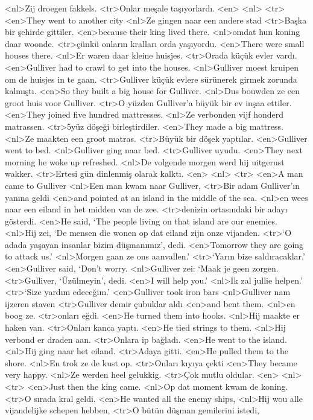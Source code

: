 <nl>Zij droegen fakkels.
<tr>Onlar meşale taşıyorlardı.
<en>
<nl>
<tr>
<en>They went to another city
<nl>Ze gingen naar een andere stad
<tr>Başka bir şehirde gittiler.
<en>because their king lived there.
<nl>omdat hun koning daar woonde.
<tr>çünkü onların kralları orda yaşıyordu.
<en>There were small houses there.
<nl>Er waren daar kleine huisjes.
<tr>Orada küçük evler vardı.
<en>Gulliver had to crawl to get into the houses.
<nl>Gulliver moest kruipen om de huisjes in te gaan.
<tr>Gulliver küçük evlere sürünerek girmek zorunda kalmıştı.
<en>So they built a big house for Gulliver.
<nl>Dus bouwden ze een groot huis voor Gulliver.
<tr>O yüzden Gulliver’a büyük bir ev inşaa ettiler.
<en>They joined five hundred mattresses.
<nl>Ze verbonden vijf honderd  matrassen.
<tr>5yüz döşeği birleştirdiler.
<en>They made a big mattress.
<nl>Ze maakten een groot matras.
<tr>Büyük bir döşek yaptılar.
<en>Gulliver went to bed.
<nl>Gulliver ging naar bed.
<tr>Gulliver uyudu.
<en>They next morning he woke up refreshed.
<nl>De volgende morgen werd hij uitgerust wakker.
<tr>Ertesi gün dinlenmiş olarak kalktı.
<en>
<nl>
<tr>
<en>A man came to Gulliver
<nl>Een man kwam naar Gulliver,
<tr>Bir adam Gulliver’ın yanına geldi
<en>and pointed at an island in the middle of the sea.
<nl>en wees naar een eiland in het midden van de zee.
<tr>denizin ortasındaki bir adayı gösterdi.
<en>He said, `The people living on that island are our enemies.
<nl>Hij zei, `De mensen die wonen op dat eiland zijn onze vijanden.
<tr>`O adada yaşayan insanlar bizim düşmanımız', dedi.
<en>Tomorrow they are going to attack us.'
<nl>Morgen gaan ze ons aanvallen.'
<tr>`Yarın bize saldıracaklar.'
<en>Gulliver said, `Don’t worry.
<nl>Gulliver zei: `Maak je geen zorgen.
<tr>Gulliver, `Üzülmeyin', dedi.
<en>I will help you.'
<nl>Ik zal jullie helpen.'
<tr>`Size yardım edeceğim.'
<en>Gulliver took iron bars
<nl>Gulliver nam ijzeren staven
<tr>Gulliver demir çubuklar aldı
<en>and bent them.
<nl>en boog ze.
<tr>onları eğdi.
<en>He turned them into hooks.
<nl>Hij maakte er haken van.
<tr>Onları kanca yaptı.
<en>He tied strings to them.
<nl>Hij verbond er draden aan. 
<tr>Onlara ip bağladı.
<en>He went to the island.
<nl>Hij ging naar het eiland.
<tr>Adaya gitti.
<en>He pulled them to the shore.
<nl>En trok ze de kust op.
<tr>Onları kıyıya çekti
<en>They became very happy.
<nl>Ze werden heel gelukkig.
<tr>Çok mutlu oldular.
<en>
<nl>
<tr>
<en>Just then the king came.
<nl>Op dat moment kwam de koning.
<tr>O sırada kral geldi.
<en>He wanted all the enemy ships,
<nl>Hij wou alle vijandelijke schepen hebben,
<tr>O bütün düşman gemilerini istedi,
